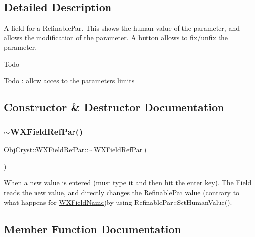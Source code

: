 \subsection{Detailed Description}
A field for a Refinable\+Par. This shows the \textquotesingle{}human\textquotesingle{} value of the parameter, and allows the modification of the parameter. A button allows to fix/unfix the parameter. \begin{DoxyRefDesc}{Todo}
\item[\mbox{\hyperlink{todo__todo000004}{Todo}}]\+: allow acces to the parameters limits \end{DoxyRefDesc}


\subsection{Constructor \& Destructor Documentation}
\mbox{\label{class_obj_cryst_1_1_w_x_field_ref_par_a7a79f02ae0835128939e35f761a042f0}} 
\subsubsection{\texorpdfstring{$\sim$WXFieldRefPar()}{~WXFieldRefPar()}}
{\footnotesize\ttfamily Obj\+Cryst\+::\+W\+X\+Field\+Ref\+Par\+::$\sim$\+W\+X\+Field\+Ref\+Par (\begin{DoxyParamCaption}{ }\end{DoxyParamCaption})}

When a new value is entered (must type it and then hit the \textquotesingle{}enter\textquotesingle{} key). The Field reads the new value, and directly changes the Refinable\+Par value (contrary to what happens for \mbox{\hyperlink{class_obj_cryst_1_1_w_x_field_name}{W\+X\+Field\+Name}})by using Refinable\+Par\+::\+Set\+Human\+Value(). 

\subsection{Member Function Documentation}
\mbox{\label{class_obj_cryst_1_1_w_x_field_ref_par_a91bdc3391485b7376466af6046a62df7}} 
